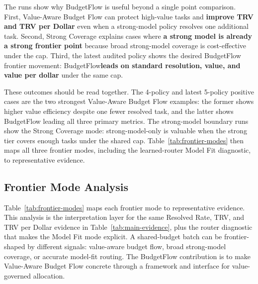 \documentclass[sigconf,review,anonymous]{acmart}
\newcommand{\method}{BudgetFlow\xspace}
\newcommand{\trv}{TRV\xspace}
\begin{document}
The runs show why \method is useful beyond a single point comparison. First, Value-Aware Budget Flow can protect high-value tasks and \textbf{improve \trv and \trv per Dollar} even when a strong-model policy resolves one additional task. Second, Strong Coverage explains cases where \textbf{a strong model is already a strong frontier point} because broad strong-model coverage is cost-effective under the cap. Third, the latest audited policy shows the desired \method frontier movement: \method \textbf{leads on standard resolution, value, and value per dollar} under the same cap.

These outcomes should be read together. The 4-policy and latest 5-policy positive cases are the two strongest Value-Aware Budget Flow examples: the former shows higher value efficiency despite one fewer resolved task, and the latter shows \method leading all three primary metrics. The strong-model boundary runs show the Strong Coverage mode: strong-model-only is valuable when the strong tier covers enough tasks under the shared cap. Table~\ref{tab:frontier-modes} then maps all three frontier modes, including the learned-router Model Fit diagnostic, to representative evidence.

\subsection{Frontier Mode Analysis}
Table~\ref{tab:frontier-modes} maps each frontier mode to representative evidence. This analysis is the interpretation layer for the same Resolved Rate, \trv, and \trv per Dollar evidence in Table~\ref{tab:main-evidence}, plus the router diagnostic that makes the Model Fit mode explicit. A shared-budget batch can be frontier-shaped by different signals: value-aware budget flow, broad strong-model coverage, or accurate model-fit routing. The \method contribution is to make Value-Aware Budget Flow concrete through a framework and interface for value-governed allocation.
\end{document}
